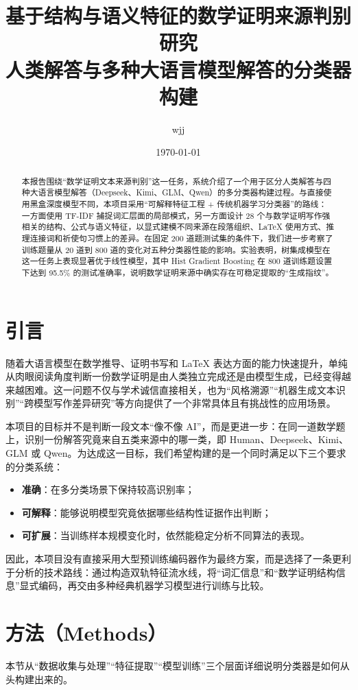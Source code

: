 \documentclass[11pt, a4paper]{ctexart}
\title{\textbf{基于结构与语义特征的数学证明来源判别研究}\\ \Large 人类解答与多种大语言模型解答的分类器构建}
\author{wjj}
\date{\today}
\begin{document}
\maketitle

\begin{abstract}
本报告围绕“数学证明文本来源判别”这一任务，系统介绍了一个用于区分人类解答与四种大语言模型解答（Deepseek、Kimi、GLM、Qwen）的多分类器构建过程。与直接使用黑盒深度模型不同，本项目采用“可解释特征工程 + 传统机器学习分类器”的路线：一方面使用 TF-IDF 捕捉词汇层面的局部模式，另一方面设计 28 个与数学证明写作强相关的结构、公式与语义特征，以显式建模不同来源在段落组织、LaTeX 使用方式、推理连接词和祈使句习惯上的差异。在固定 200 道题测试集的条件下，我们进一步考察了训练题量从 20 道到 800 道的变化对五种分类器性能的影响。实验表明，树集成模型在这一任务上表现显著优于线性模型，其中 Hist Gradient Boosting 在 800 道训练题设置下达到 95.5\% 的测试准确率，说明数学证明来源中确实存在可稳定提取的“生成指纹”。
\end{abstract}

\section{引言}
随着大语言模型在数学推导、证明书写和 LaTeX 表达方面的能力快速提升，单纯从肉眼阅读角度判断一份数学证明是由人类独立完成还是由模型生成，已经变得越来越困难。这一问题不仅与学术诚信直接相关，也为“风格溯源”“机器生成文本识别”“跨模型写作差异研究”等方向提供了一个非常具体且有挑战性的应用场景。

本项目的目标并不是判断一段文本“像不像 AI”，而是更进一步：在同一道数学题上，识别一份解答究竟来自五类来源中的哪一类，即 Human、Deepseek、Kimi、GLM 或 Qwen。为达成这一目标，我们希望构建的是一个同时满足以下三个要求的分类系统：
\begin{itemize}
    \item \textbf{准确}：在多分类场景下保持较高识别率；
    \item \textbf{可解释}：能够说明模型究竟依据哪些结构性证据作出判断；
    \item \textbf{可扩展}：当训练样本规模变化时，依然能稳定分析不同算法的表现。
\end{itemize}

因此，本项目没有直接采用大型预训练编码器作为最终方案，而是选择了一条更利于分析的技术路线：通过构造双轨特征流水线，将“词汇信息”和“数学证明结构信息”显式编码，再交由多种经典机器学习模型进行训练与比较。

\section{方法（Methods）}
本节从“数据收集与处理”“特征提取”“模型训练”三个层面详细说明分类器是如何从头构建出来的。
\end{document}

